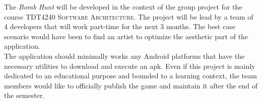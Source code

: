 The \textit{Bomb Hunt} will be developed in the context of the group project for the course \textsc{TDT4240 Software Architecture}. The project will be lead by a team of 4 developers that will work part-time for the next 3 months. The best case scenario would have been to find an artist to optimize the aesthetic part of the application. \\

The application should minimally works any Android platforms that have the necessary utilities to download and execute an \gls{apk}. Even if this project is mainly dedicated to an educational purpose and bounded to a learning context, the team members would like to officially publish the game and maintain it after the end of the semester.
